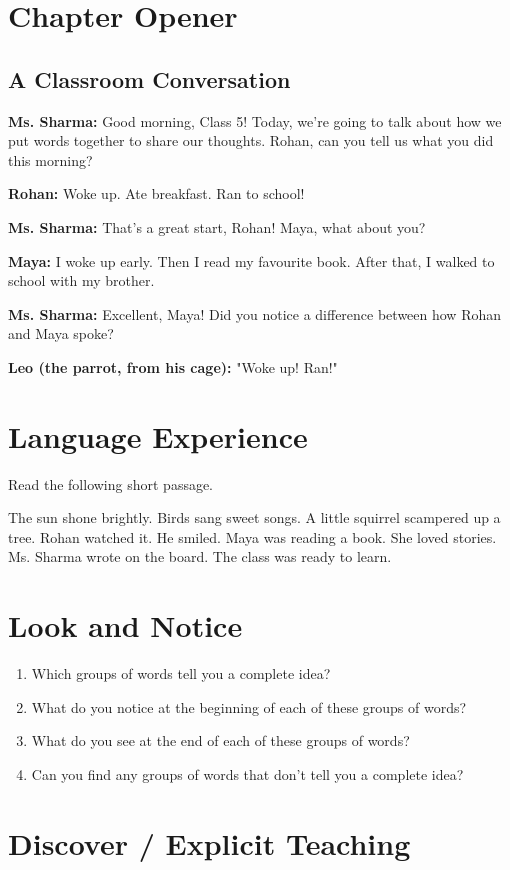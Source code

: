 \section{Chapter Opener}
\subsection*{A Classroom Conversation}
\textbf{Ms. Sharma:} Good morning, Class 5! Today, we're going to talk about how we put words together to share our thoughts. Rohan, can you tell us what you did this morning?

\textbf{Rohan:} Woke up. Ate breakfast. Ran to school!

\textbf{Ms. Sharma:} That's a great start, Rohan! Maya, what about you?

\textbf{Maya:} I woke up early. Then I read my favourite book. After that, I walked to school with my brother.

\textbf{Ms. Sharma:} Excellent, Maya! Did you notice a difference between how Rohan and Maya spoke?

\textbf{Leo (the parrot, from his cage):} "Woke up! Ran!"

\section{Language Experience}
Read the following short passage.

The sun shone brightly. Birds sang sweet songs. A little squirrel scampered up a tree. Rohan watched it. He smiled. Maya was reading a book. She loved stories. Ms. Sharma wrote on the board. The class was ready to learn.

\section{Look and Notice}
\begin{enumerate}
    \item Which groups of words tell you a complete idea?
    \item What do you notice at the beginning of each of these groups of words?
    \item What do you see at the end of each of these groups of words?
    \item Can you find any groups of words that don't tell you a complete idea?
\end{enumerate}

\section{Discover / Explicit Teaching}
